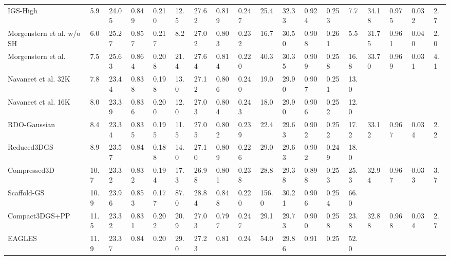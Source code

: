 {\begin{adjustbox}{center}
\begin{tabular}{ll|llll|llll|llll|llll}
IGS-High & 5.9 & 24.05 & 0.849 & 0.210 & 12.5 & 27.62 & \cellcolor{lightorange}0.819 & 0.247 & 25.4 & \cellcolor{lightred}32.33 & \cellcolor{lightred}0.924 & 0.253 & 7.7 & \cellcolor{lightred}34.18 & \cellcolor{lightred}0.975 & \cellcolor{lightorange}0.032 & 2.7 \\
Morgenstern et al. w/o SH & 6.0 & \cellcolor{lightorange}25.27 & \cellcolor{lightorange}0.857 & 0.217 & \cellcolor{lightorange}8.2 & 27.02 & 0.803 & 0.232 & \cellcolor{lightyellow}16.7 & \cellcolor{lightyellow}30.50 & 0.908 & 0.261 & \cellcolor{lightorange}5.5 & 31.75 & 0.961 & 0.040 & 2.0 \\
Morgenstern et al. & 7.5 & \cellcolor{lightred}25.63 & \cellcolor{lightred}0.864 & 0.208 & 21.4 & \cellcolor{lightyellow}27.64 & \cellcolor{lightyellow}0.814 & \cellcolor{lightred}0.220 & 40.3 & 30.35 & \cellcolor{lightyellow}0.909 & 0.258 & 16.8 & \cellcolor{lightyellow}33.70 & \cellcolor{lightyellow}0.969 & \cellcolor{lightred}0.031 & 4.1 \\
Navaneet et al. 32K & 7.8 & 23.44 & 0.838 & 0.198 & 13.0 & 27.12 & 0.806 & 0.240 & 19.0 & 29.90 & 0.907 & \cellcolor{lightyellow}0.251 & 13.0 &  &  &  &  \\
Navaneet et al. 16K & 8.0 & 23.39 & 0.836 & 0.200 & 12.0 & 27.03 & 0.804 & 0.243 & 18.0 & 29.90 & 0.906 & 0.252 & 12.0 &  &  &  &  \\
RDO-Gaussian & 8.4 & 23.34 & 0.835 & 0.195 & 11.5 & 27.05 & 0.802 & 0.239 & 22.4 & 29.63 & 0.902 & 0.252 & 17.2 & 33.12 & 0.967 & 0.034 & 2.2 \\
Reduced3DGS & 8.9 & 23.57 & 0.84 & 0.188 & 14.0 & 27.10 & 0.809 & \cellcolor{lightorange}0.226 & 29.0 & 29.63 & 0.902 & \cellcolor{lightred}0.249 & 18.0 &  &  &  &  \\
Compressed3D & 10.7 & 23.32 & 0.832 & 0.194 & 17.3 & 26.98 & 0.801 & 0.238 & 28.8 & 29.38 & 0.898 & 0.253 & 25.3 & 32.94 & 0.967 & \cellcolor{lightyellow}0.033 & 3.7 \\
Scaffold-GS & 10.9 & 23.96 & \cellcolor{lightyellow}0.853 & \cellcolor{lightorange}0.177 & 87.0 & \cellcolor{lightred}28.84 & \cellcolor{lightred}0.848 & \cellcolor{lightred}0.220 & 156.0 & 30.21 & 0.906 & 0.254 & 66.0 &  &  &  &  \\
Compact3DGS+PP & 11.5 & 23.32 & 0.831 & 0.202 & 20.9 & 27.03 & 0.797 & 0.247 & 29.1 & 29.73 & 0.900 & 0.258 & 23.8 & 32.88 & 0.968 & 0.034 & 2.7 \\
EAGLES & 11.9 & 23.37 & 0.84 & 0.20 & 29.0 & 27.23 & 0.81 & 0.24 & 54.0 & 29.86 & \cellcolor{lightorange}0.91 & \cellcolor{lightorange}0.25 & 52.0 &  &  &  &  \\

\end{tabular}
\end{adjustbox}}
